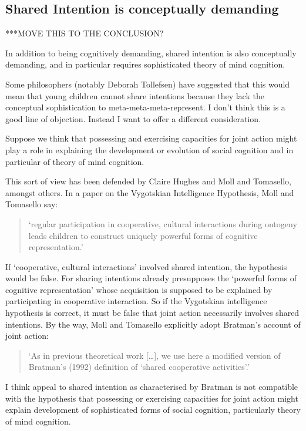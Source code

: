 \documentclass[12pt,a4paper]{extarticle}
\begin{document}
\subsection{Shared Intention is conceptually demanding}

***MOVE THIS TO THE CONCLUSION?

In addition to being cognitively demanding, shared intention is also conceptually demanding, and in particular requires sophisticated theory of mind cognition.  

Some philosophers (notably Deborah Tollefsen) have suggested that this would mean that young children cannot share intentions because they lack the conceptual sophistication to meta-meta-meta-represent.  I don't think this is a good line of objection.  Instead I want to offer a different consideration.

Suppose we think that possessing and exercising capacities for joint action might play a role in explaining the development or evolution of social cognition and in particular of theory of mind cognition.

This sort of view has been defended by Claire Hughes and Moll and Tomasello, amongst others.  In a paper on the Vygotskian Intelligence Hypothesis, Moll and Tomasello say:
%
\begin{quote}
`regular participation in cooperative, cultural interactions during ontogeny leads children to construct uniquely powerful forms of cognitive representation.'
\citep[pp.\ 2-3]{Moll:2007gu}
\end{quote}
%
If `cooperative, cultural interactions' involved shared intention, the hypothesis would be false.  For sharing intentions already presupposes the `powerful forms of cognitive representation' whose acquisition is supposed to be explained by participating in cooperative interaction.
So if the Vygotskian intelligence hypothesis is correct, it must be false that joint action necessarily involves shared intentions.
By the way, Moll and Tomasello explicitly adopt Bratman’s account of joint action:
%
\begin{quote}
`As in previous theoretical work […], we use here a modified version of Bratman’s (1992) definition of `shared cooperative activities'.'
\citep[p.\ 3]{Moll:2007gu}
\end{quote}
%
I think appeal to shared intention as characterised by Bratman is not compatible with the hypothesis that possessing or exercising capacities for joint action might explain development of sophisticated forms of social cognition, particularly theory of mind cognition.
\end{document}
